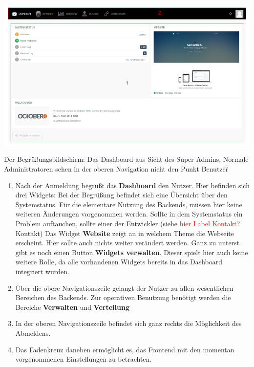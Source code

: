   \includegraphics[scale=0.3]{backend/img/dashboard.png}
  \caption{\newline Der Begrüßungsbildschirm: Das Dashboard aus Sicht des Super-Admins.\newline
	  Normale Administratoren sehen in der oberen Navigation nicht den Punkt \"Benutzer\"}
  \begin{enumerate}
   \item Nach der Anmeldung begrüßt das \textbf{Dashboard} den Nutzer. 
	  Hier befinden sich drei Widgets:\newline
	  Bei der Begrüßung befindet sich eine Übersicht über den Systemstatus.\newline
	  Für die elementare Nutzung des Backends, müssen hier keine weiteren Änderungen vorgenommen werden.\newline
	  Sollte in dem Systemstatus ein Problem auftauchen, sollte einer der Entwickler (siehe \textcolor{red}{hier Label Kontakt?}Kontakt)\newline
	  Das Widget \textbf{Website} zeigt an in welchem Theme die Webseite erscheint. Hier sollte auch nichts weiter verändert werden.
	  Ganz zu unterst gibt es noch einen Button \textbf{Widgets verwalten}. 
	  Dieser spielt hier auch keine weitere Rolle, da alle vorhandenen Widgets bereits in das Dashboard integriert wurden.
   \item Über die obere Navigationszeile gelangt der Nutzer zu allen wesentlichen Bereichen des Backends.
	 Zur operativen Benutzung benötigt werden die Bereiche \textbf{Verwalten} und \textbf{Verteilung}
   \item In der oberen Navigationszeile befindet sich ganz rechts die Möglichkeit des Abmeldens.
   \item Das Fadenkreuz daneben ermöglicht es, das Frontend mit den momentan vorgenommenen Einstellungen zu betrachten.
  \end{enumerate}

